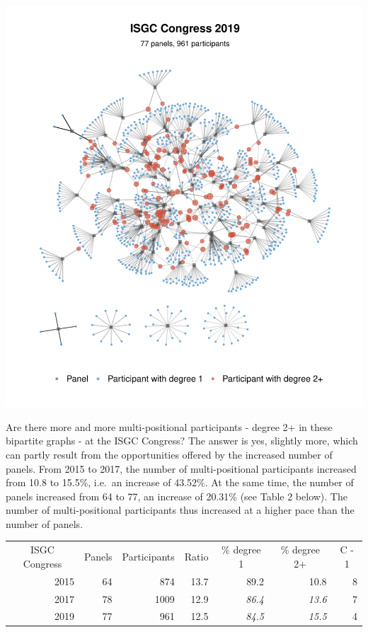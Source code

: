 \documentclass[
]{article}
\begin{document}
\includegraphics[width=33.33in]{plots/congres-isgc2019-2mode}

Are there more and more multi-positional participants - degree 2+ in
these bipartite graphs - at the ISGC Congress? The answer is yes,
slightly more, which can partly result from the opportunities offered by
the increased number of panels. From 2015 to 2017, the number of
multi-positional participants increased from 10.8 to 15.5\%, i.e.~an
increase of 43.52\%. At the same time, the number of panels increased
from 64 to 77, an increase of 20.31\% (see Table 2 below). The number of
multi-positional participants thus increased at a higher pace than the
number of panels.

\begin{table}
\centering
\begin{tabular}[t]{r|r|r|r|>{}r|>{}r|r}
\hline
\multicolumn{1}{c|}{ISGC Congress} & \multicolumn{1}{c|}{Panels} & \multicolumn{1}{c|}{Participants} & \multicolumn{1}{c|}{Ratio} & \multicolumn{1}{c|}{\% degree 1} & \multicolumn{1}{c|}{\% degree 2+} & \multicolumn{1}{c}{C - 1} \\
\cline{1-1} \cline{2-2} \cline{3-3} \cline{4-4} \cline{5-5} \cline{6-6} \cline{7-7}
2015 & 64 & 874 & 13.7 & 89.2 & 10.8 & 8\\
\hline
2017 & 78 & 1009 & 12.9 & \em{86.4} & \em{13.6} & 7\\
\hline
2019 & 77 & 961 & 12.5 & \em{84.5} & \em{15.5} & 4\\
\hline
\end{tabular}
\end{table}
\end{document}
